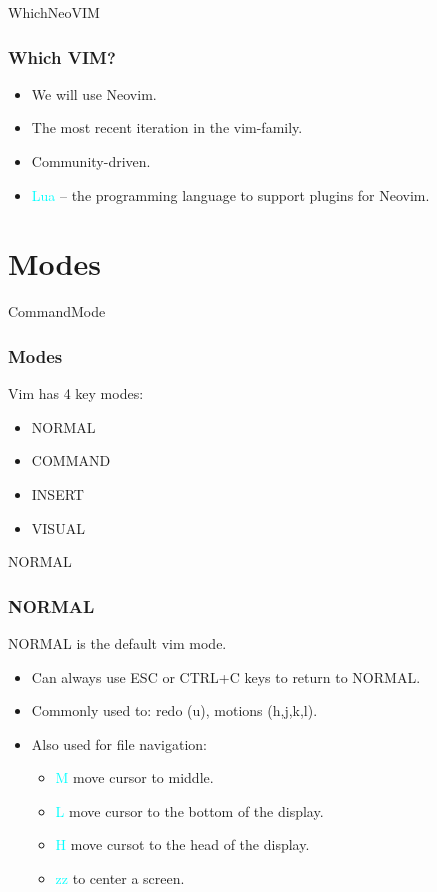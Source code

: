 \documentclass{beamer}
\newcommand{\highlight}[1]{\textcolor{cyan}{\textsf{#1}}}
\begin{document}
\begin{frame}{WhichNeoVIM}
    \frametitle{Which VIM?}
    \begin{itemize}
        \item We will use Neovim.
        \item The most recent iteration in the vim-family.
        \item Community-driven.
        \item \highlight{Lua} -- the programming language to support plugins for Neovim.
    \end{itemize}
\end{frame}

\section{Modes}
\begin{frame}{CommandMode}
    \frametitle{Modes}
    Vim has 4 key modes:
    \begin{itemize}
        \item NORMAL
        \item COMMAND
        \item INSERT
        \item VISUAL
    \end{itemize}
\end{frame}

\begin{frame}{NORMAL}
    \frametitle{NORMAL}
    NORMAL is the default vim mode.
    \begin{itemize}
        \item Can always use ESC or CTRL+C keys to return to NORMAL.
        \item Commonly used to: redo (u), motions (h,j,k,l).
        \item Also used for file navigation:
            \begin{itemize}
                \item \highlight{M} move cursor to middle.
                \item \highlight{L} move cursor to the bottom of the display.
                \item \highlight{H} move cursot to the head of the display.
                \item \highlight{zz} to center a screen.
            \end{itemize}
    \end{itemize}
\end{frame}
\end{document}
